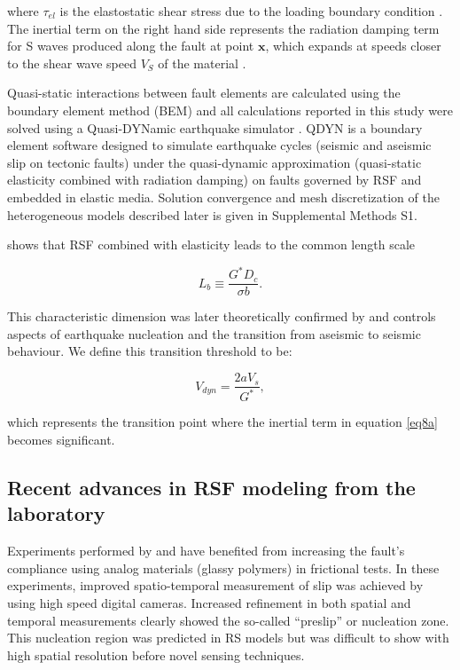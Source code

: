 \documentclass[preprint,1p, 10pt,authoryear]{elsarticle}
\begin{document}
\noindent where $\tau_{el}$ is the elastostatic shear stress due to the loading boundary condition \citep{Horowitz1989}. The inertial term on the right hand side represents the radiation damping term for S waves produced along the fault at point $\mathbf{x}$, which expands at speeds closer to the shear wave speed $V_{S}$ of the material \citep{Rice1993}. 

Quasi-static interactions between fault elements are calculated using the boundary element method (BEM) and all calculations reported in this study were solved using a Quasi-DYNamic earthquake simulator \citep{Luo2017}. QDYN is a boundary element software designed to simulate earthquake cycles (seismic and aseismic slip on tectonic faults) under the quasi-dynamic approximation (quasi-static elasticity combined with radiation damping) on faults governed by RSF and embedded in elastic media.  Solution convergence and mesh discretization of the heterogeneous models described later is given in Supplemental Methods S1.

\citet{Dieterich1992} shows that RSF combined with elasticity leads to the common length scale

\begin{equation}
\label{eq8b}
L_{b} \equiv \frac{G^{*}D_{c}}{\sigma b}.
\end{equation}  

\noindent This characteristic dimension was later theoretically confirmed by \citet{Rubin2005} and controls aspects of earthquake nucleation and the transition from aseismic to seismic behaviour. We define this transition threshold to be:

\begin{equation}
\label{eq8c}
V_{dyn} = \frac{2 a V_{s}}{G^{*}},
\end{equation}  

\noindent which represents the transition point where the inertial term in equation \eqref{eq8a} becomes significant. 

\subsection{Recent advances in RSF modeling from the laboratory}
\label{advances RSF}
Experiments performed by \citet{Nielsen2010} and \citet{Latour2013} have benefited from increasing the fault's compliance using analog materials (glassy polymers) in frictional tests. In these experiments, improved spatio-temporal measurement of slip was achieved by using high speed digital cameras. Increased refinement in both spatial and temporal measurements clearly showed the so-called ``preslip'' or nucleation zone.  This nucleation region was predicted in RS models \citep{Dieterich1992, Rubin2005, Ampuero2008} but was difficult to show with high spatial resolution before novel sensing techniques.
\end{document}
